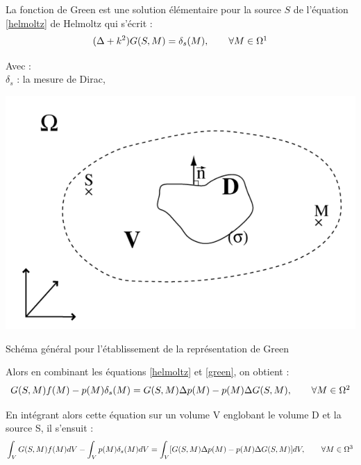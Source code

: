 La fonction de Green est une solution élémentaire pour la source $S$ de l'équation \ref{helmoltz} de Helmoltz qui s'écrit :
\begin{equation} \label{green}
(\Delta + k^2)G(S,M) = \delta_s(M),	 	\qquad  \forall M  \in \Omega
\footnotemark
\end{equation}

Avec : \\
$\delta_s$ : la mesure de \gls{Dirac}, \\

\begin{figureth}
	\includegraphics[width=0.6\linewidth]{images/green}
	\caption[Schéma général pour l'établissement de la représentation de Green]{Schéma général pour l'établissement de la représentation de Green \footnotemark}
\end{figureth}

Alors en combinant les équations \ref{helmoltz} et \ref{green}, on obtient :
\begin{equation}
G(S,M)f(M)-p(M)\delta_s(M) = G(S,M)\Delta p(M)-p(M)\Delta G(S,M),	 	\qquad  \forall M  \in \Omega
\footnotemark
\end{equation}

En intégrant alors cette équation sur un volume V englobant le volume D et la source S, il s'ensuit :
\begin{equation}
\int_V G(S,M) f(M) dV - \int_Vp(M)\delta_s(M) dV = \int_V [G(S,M)\Delta p(M) - p(M)\Delta G(S,M)] dV,	 	\qquad  \forall M  \in \Omega
 \footnotemark
\end{equation}

